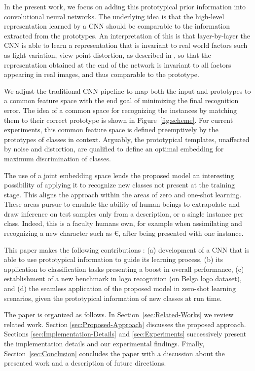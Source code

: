\documentclass{bmvc2k}
\begin{document}
In the present work, we focus on adding this prototypical prior information into convolutional neural networks. 
The underlying idea is that the high-level representation learned by a CNN should be comparable to the 
information extracted from the prototypes. An interpretation of this is that 
layer-by-layer the CNN is able to learn a representation that is invariant to real world
 factors such as light variation, view point distortion, as described in \cite{goodfellow2009measuring}, so that the representation obtained
  at the end of the network is invariant to all factors appearing in real images, and thus 
  comparable to the prototype.  

We adjust the traditional CNN pipeline to map both the input and prototypes to a
common feature space with the end goal of minimizing the final recognition error. The idea of
a common space for recognizing the instances by matching them to their
correct prototype is shown in Figure~\ref{fig:scheme}. For current
experiments, this common feature space is defined preemptively by the
prototypes of classes in context. Arguably, the prototypical templates, unaffected by noise
and distortion, are qualified to define an optimal embedding for maximum discrimination of classes.

The use of a joint embedding space lends the proposed model an interesting possibility 
of applying it to recognize new classes not present at the training stage. This aligns 
the approach within the areas of zero and one-shot learning. These areas pursue to 
emulate the ability of human beings to extrapolate and draw inference on test samples 
only from a description, or a single instance per class. Indeed, this is a faculty humans 
own, for example when assimilating and recognizing a new character such as \euro, after 
being presented with one instance. 


This paper makes the following contributions : (a) development of a CNN that is
able to use prototypical information to guide its learning process, (b) its application to classification
tasks presenting a boost in overall performance, (c) establishment of a new
benchmark in logo recognition (on Belga logo dataset), and (d) the seamless
application of the proposed model in zero-shot learning scenarios, given the
prototypical information of new classes at run time.


The paper is organized as follows. In Section~\ref{sec:Related-Works} we review related work. 
Section \ref{sec:Proposed-Approach} discusses the proposed approach. Sections
\ref{sec:Implementation-Details} and \ref{sec:Experiments} successively present the implementation details and
our experimental findings. Finally, Section~\ref{sec:Conclusion} concludes the
paper with a discussion about the presented work and a description of future
directions.
\end{document}

